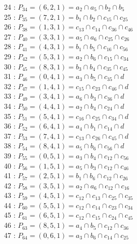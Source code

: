 \documentclass{article}
\begin{document}
{24 : $P_{34}=( 6, 2, 1 ) = a_{2} \cap a_{5} \cap b_{2} \cap b_{5}$\\
25 : $P_{35}=( 7, 2, 1 ) = b_{1} \cap b_{2} \cap c_{15} \cap c_{25}$\\
26 : $P_{38}=( 1, 3, 1 ) = c_{13} \cap c_{14} \cap c_{36} \cap c_{46}$\\
27 : $P_{40}=( 3, 3, 1 ) = a_{5} \cap a_{6} \cap c_{25} \cap c_{26}$\\
28 : $P_{41}=( 4, 3, 1 ) = b_{1} \cap b_{5} \cap c_{16} \cap c_{56}$\\
29 : $P_{42}=( 5, 3, 1 ) = a_{2} \cap b_{6} \cap c_{15} \cap c_{34}$\\
30 : $P_{45}=( 8, 3, 1 ) = b_{3} \cap b_{4} \cap c_{35} \cap c_{45}$\\
31 : $P_{46}=( 0, 4, 1 ) = a_{3} \cap b_{5} \cap c_{35} \cap d$\\
32 : $P_{47}=( 1, 4, 1 ) = c_{15} \cap c_{23} \cap c_{46} \cap d$\\
33 : $P_{49}=( 3, 4, 1 ) = a_{6} \cap b_{3} \cap c_{36} \cap d$\\
34 : $P_{50}=( 4, 4, 1 ) = a_{2} \cap b_{4} \cap c_{24} \cap d$\\
35 : $P_{51}=( 5, 4, 1 ) = c_{16} \cap c_{25} \cap c_{34} \cap d$\\
36 : $P_{52}=( 6, 4, 1 ) = a_{4} \cap b_{1} \cap c_{14} \cap d$\\
37 : $P_{53}=( 7, 4, 1 ) = c_{13} \cap c_{26} \cap c_{45} \cap d$\\
38 : $P_{54}=( 8, 4, 1 ) = a_{5} \cap b_{6} \cap c_{56} \cap d$\\
39 : $P_{55}=( 0, 5, 1 ) = a_{3} \cap b_{4} \cap c_{12} \cap c_{56}$\\
40 : $P_{56}=( 1, 5, 1 ) = a_{5} \cap b_{3} \cap c_{12} \cap c_{46}$\\
41 : $P_{57}=( 2, 5, 1 ) = b_{1} \cap b_{6} \cap c_{12} \cap c_{26}$\\
42 : $P_{58}=( 3, 5, 1 ) = a_{2} \cap a_{6} \cap c_{12} \cap c_{16}$\\
43 : $P_{59}=( 4, 5, 1 ) = c_{12} \cap c_{13} \cap c_{25} \cap c_{35}$\\
44 : $P_{60}=( 5, 5, 1 ) = c_{12} \cap c_{14} \cap c_{23} \cap c_{34}$\\
45 : $P_{61}=( 6, 5, 1 ) = c_{12} \cap c_{15} \cap c_{24} \cap c_{45}$\\
46 : $P_{63}=( 8, 5, 1 ) = a_{4} \cap b_{5} \cap c_{12} \cap c_{36}$\\
47 : $P_{64}=( 0, 6, 1 ) = a_{3} \cap b_{6} \cap c_{14} \cap c_{25}$\\
}
\end{document}
